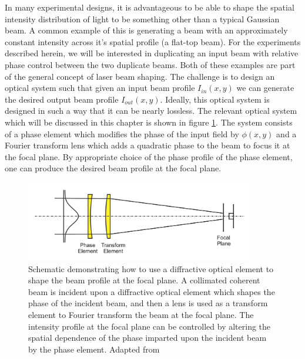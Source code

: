 In many experimental designs, it is advantageous to be able to shape the spatial intensity distribution of light to be something other than a typical Gaussian beam.  A common example of this is generating a beam with an approximately constant intensity across it's spatial profile (a flat-top beam).  For the experiments described herein, we will be interested in duplicating an input beam with relative phase control between the two duplicate beams.  Both of these examples are part of the general concept of laser beam shaping.  The challenge is to design an optical system such that given an input beam profile $I_{in}(x,y)$ we can generate the desired output beam profile $I_{out}(x,y)$. Ideally, this optical system is designed in such a way that it can be nearly lossless.  The relevant optical system which will be discussed in this chapter is shown in figure \ref{fig:beam_shaping_scheme}.  The system consists of a phase element which modifies the phase of the input field by $\phi(x,y)$ and a Fourier transform lens which adds a quadratic phase to the beam to focus it at the focal plane.  By appropriate choice of the phase profile of the phase element, one can produce the desired beam profile at the focal plane.


\begin{figure}
	\centering
	\includegraphics[width=0.9\textwidth]{figures/Two_source/romero_beam_shaping_schematic.png}
	\caption{Schematic demonstrating how to use a diffractive optical element to shape the beam profile at the focal plane. A collimated coherent beam is incident upon a diffractive optical element which shapes the phase of the incident beam, and then a lens is used as a transform element to Fourier transform the beam at the focal plane.  The intensity profile at the focal plane can be controlled by altering the spatial dependence of the phase imparted upon the incident beam by the phase element. Adapted from \cite{romeroMathematicalAspectsLaser2010}}
	\label{fig:beam_shaping_scheme}
\end{figure}


